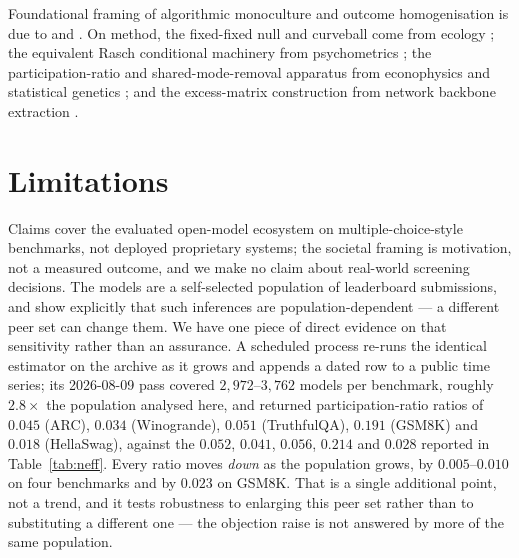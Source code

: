 \documentclass[pdflatex,sn-mathphys-ay]{sn-jnl}
\theoremstyle{thmstyleone}
\theoremstyle{thmstylethree}
\begin{document}
Foundational framing of algorithmic monoculture and outcome homogenisation is due to
\citet{kleinberg2021monoculture} and \citet{bommasani2022homogenization}. On method, the
fixed-fixed null and curveball come from ecology
\citep{connor1979,schluter1984,gotelli2000,strona2014}; the equivalent Rasch conditional
machinery from psychometrics
\citep{rasch1960,andersen1973,besag1989,ponocny2001,verhelst2008,miller2013}; the
participation-ratio and shared-mode-removal apparatus from econophysics
\citep{laloux1999,plerou1999} and statistical genetics
\citep{cheverud2001,nyholt2004,liji2005}; and the excess-matrix construction from network
backbone extraction \citep{neal2021}.

\section{Limitations}

Claims cover the evaluated open-model ecosystem on multiple-choice-style benchmarks, not deployed
proprietary systems; the societal framing is motivation, not a measured outcome, and we make no
claim about real-world screening decisions. The models are a self-selected population of
leaderboard submissions, and \citet{jo2026subjectivity} show explicitly that such inferences are
population-dependent --- a different peer set can change them. We have one piece of direct
evidence on that sensitivity rather than an assurance. A scheduled process re-runs the identical
estimator on the archive as it grows and appends a dated row to a public time series; its
2026-08-09 pass covered $2{,}972$--$3{,}762$ models per benchmark, roughly $2.8\times$ the
population analysed here, and returned participation-ratio ratios of $0.045$ (ARC), $0.034$
(Winogrande), $0.051$ (TruthfulQA), $0.191$ (GSM8K) and $0.018$ (HellaSwag), against the
$0.052$, $0.041$, $0.056$, $0.214$ and $0.028$ reported in Table~\ref{tab:neff}. Every ratio moves
\emph{down} as the population grows, by $0.005$--$0.010$ on four benchmarks and by $0.023$ on
GSM8K. That is a
single additional point, not a trend, and it tests robustness to enlarging this peer set rather
than to substituting a different one --- the objection \citeauthor{jo2026subjectivity} raise is
not answered by more of the same population.
\end{document}
